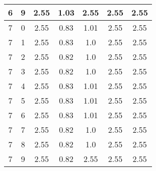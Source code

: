 \begin{longtable}{|c|c||c||c|c||c|c|}
	6 & 9 & 2.55 & 1.03 & 2.55 & 2.55 & 2.55 \\ \hline
	7 & 0 & 2.55 & 0.83 & 1.01 & 2.55 & 2.55 \\ \hline
	7 & 1 & 2.55 & 0.83 & 1.0 & 2.55 & 2.55 \\ \hline
	7 & 2 & 2.55 & 0.82 & 1.0 & 2.55 & 2.55 \\ \hline
	7 & 3 & 2.55 & 0.82 & 1.0 & 2.55 & 2.55 \\ \hline
	7 & 4 & 2.55 & 0.83 & 1.01 & 2.55 & 2.55 \\ \hline
	7 & 5 & 2.55 & 0.83 & 1.01 & 2.55 & 2.55 \\ \hline
	7 & 6 & 2.55 & 0.83 & 1.01 & 2.55 & 2.55 \\ \hline
	7 & 7 & 2.55 & 0.82 & 1.0 & 2.55 & 2.55 \\ \hline
	7 & 8 & 2.55 & 0.82 & 1.0 & 2.55 & 2.55 \\ \hline
	7 & 9 & 2.55 & 0.82 & 2.55 & 2.55 & 2.55 \\ \hline
\end{longtable}
\clearpage{}
